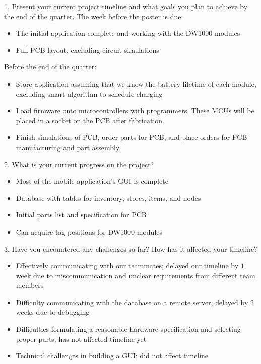 \documentclass{article}
\begin{document}
1. Present your current project timeline and what goals you plan to achieve by the end of the quarter.
The week before the poster is due:
\begin{itemize}
\item The initial application complete and working with the DW1000 modules
\item Full PCB layout, excluding circuit simulations
\end{itemize}
Before the end of the quarter:
\begin{itemize}
\item Store application assuming that we know the battery lifetime of each module, excluding smart algorithm to schedule charging
\item Load firmware onto microcontrollers with programmers. These MCUs will be placed in a socket on the PCB after fabrication.
\item Finish simulations of PCB, order parts for PCB, and place orders for PCB manufacturing and part assembly.
\end{itemize}

2. What is your current progress on the project?
\begin{itemize}
\item Most of the mobile application's GUI is complete
\item Database with tables for inventory, stores, items, and nodes
\item Initial parts list and specification for PCB
\item Can acquire tag positions for DW1000 modules
\end{itemize}

3. Have you encountered any challenges so far? How has it affected your timeline?
\begin{itemize}
\item Effectively communicating with our teammates; delayed our timeline by $1$ week due to miscommunication and unclear requirements from different team members
\item Difficulty communicating with the database on a remote server; delayed by $2$ weeks due to debugging
\item Difficulties formulating a reasonable hardware specification and selecting proper parts; has not affected timeline yet
\item Technical challenges in building a GUI; did not affect timeline
\end{itemize}
\end{document}
